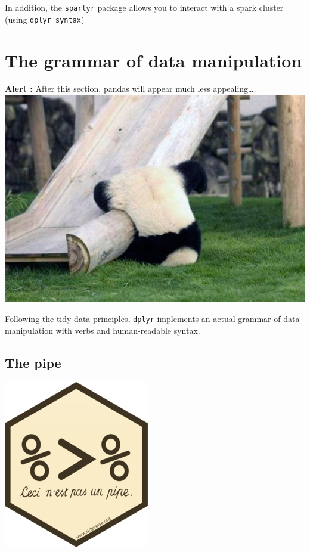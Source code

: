 \documentclass[
]{book}
\begin{document}
In addition, the \texttt{sparlyr} package allows you to interact with a spark cluster (using \texttt{dplyr\ syntax})

\hypertarget{the-grammar-of-data-manipulation}{%
\section{The grammar of data manipulation}\label{the-grammar-of-data-manipulation}}

\textbf{Alert :} After this section, pandas will appear much less appealing\ldots.
\includegraphics{img/pandas-fun.jpg}

Following the tidy data principles, \texttt{dplyr} implements an actual grammar of data manipulation with verbs and human-readable syntax.

\hypertarget{the-pipe}{%
\subsection{The pipe}\label{the-pipe}}

\includegraphics{img/pipe.png}
\end{document}
